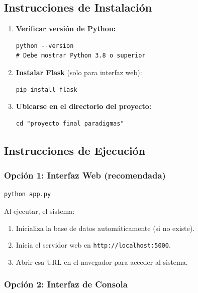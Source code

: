 \documentclass[12pt, a4paper]{article}
\begin{document}
\subsection{Instrucciones de Instalación}

\begin{enumerate}[leftmargin=2em]
    \item \textbf{Verificar versión de Python:}
    \begin{lstlisting}[style=bash]
python --version
# Debe mostrar Python 3.8 o superior
    \end{lstlisting}

    \item \textbf{Instalar Flask} (solo para interfaz web):
    \begin{lstlisting}[style=bash]
pip install flask
    \end{lstlisting}

    \item \textbf{Ubicarse en el directorio del proyecto:}
    \begin{lstlisting}[style=bash]
cd "proyecto final paradigmas"
    \end{lstlisting}
\end{enumerate}

\subsection{Instrucciones de Ejecución}

\subsubsection{Opción 1: Interfaz Web (recomendada)}

\begin{lstlisting}[style=bash]
python app.py
\end{lstlisting}

Al ejecutar, el sistema:
\begin{enumerate}[leftmargin=2em]
    \item Inicializa la base de datos automáticamente (si no existe).
    \item Inicia el servidor web en \texttt{http://localhost:5000}.
    \item Abrir esa URL en el navegador para acceder al sistema.
\end{enumerate}

\subsubsection{Opción 2: Interfaz de Consola}
\end{document}
